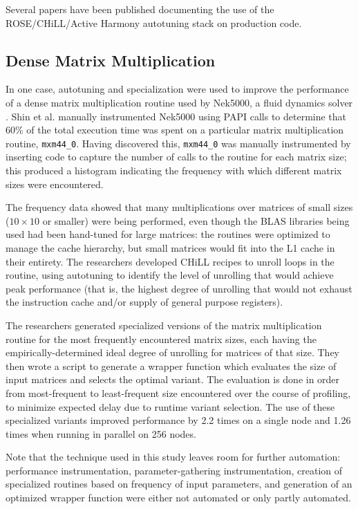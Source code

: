 \documentclass[msthesis,justified,copyright,final,numbers,sort&compress,
gsmodern,amstex,natbib]{uothesis}
\begin{document}
Several papers have been published documenting the use of the ROSE/CHiLL/Active Harmony autotuning stack on production code.

\subsection{Dense Matrix Multiplication}
\label{dense}

In one case, autotuning and specialization were used to improve the performance of a dense matrix multiplication routine used by Nek5000, a fluid dynamics solver \cite{nek5000}. Shin et al. manually instrumented Nek5000 using PAPI calls to determine that 60\% of the total execution time was spent on a particular matrix multiplication routine, \texttt{mxm44\_0}. Having discovered this, \texttt{mxm44\_0} was manually instrumented by inserting code to capture the number of calls to the routine for each matrix size; this produced a histogram indicating the frequency with which different matrix sizes were encountered.

The frequency data showed that many multiplications over matrices of small sizes ($10 \times 10$ or smaller) were being performed, even though the BLAS libraries being used had been hand-tuned for large matrices: the routines were optimized to manage the cache hierarchy, but small matrices would fit into the L1 cache in their entirety. The researchers developed CHiLL recipes to unroll loops in the routine, using autotuning to identify the level of unrolling that would achieve peak performance (that is, the highest degree of unrolling that would not exhaust the instruction cache and/or supply of general purpose registers).

The researchers generated specialized versions of the matrix multiplication routine for the most frequently encountered matrix sizes, each having the empirically-determined ideal degree of unrolling for matrices of that size. They then wrote a script to generate a wrapper function which evaluates the size of input matrices and selects the optimal variant. The evaluation is done in order from most-frequent to least-frequent size encountered over the course of profiling, to minimize expected delay due to runtime variant selection. The use of these specialized variants improved performance by 2.2 times on a single node and 1.26 times when running in parallel on 256 nodes.

Note that the technique used in this study leaves room for further automation: performance instrumentation, parameter-gathering instrumentation, creation of specialized routines based on frequency of input parameters, and generation of an optimized wrapper function were either not automated or only partly automated. 
\end{document}
